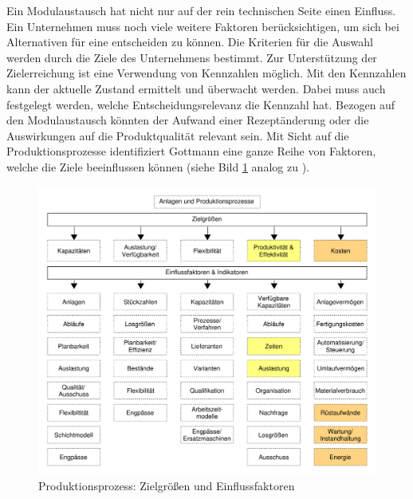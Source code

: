 Ein Modulaustausch hat nicht nur auf der rein technischen Seite einen Einfluss. Ein Unternehmen muss noch viele weitere Faktoren berücksichtigen, um sich bei Alternativen für eine entscheiden zu können. Die Kriterien für die Auswahl werden durch die Ziele des Unternehmens bestimmt. Zur Unterstützung der Zielerreichung ist eine Verwendung von Kennzahlen möglich. Mit den Kennzahlen kann der aktuelle Zustand ermittelt und überwacht werden. Dabei muss auch festgelegt werden, welche Entscheidungsrelevanz die Kennzahl hat.  Bezogen auf den Modulaustausch könnten der Aufwand einer Rezeptänderung oder die Auswirkungen auf die Produktqualität relevant sein. Mit Sicht auf die Produktionsprozesse identifiziert Gottmann \cite{Gottmann2016} eine ganze Reihe von Faktoren, welche die Ziele beeinflussen können (siehe Bild \ref{pic:Produktionsprozesse-Zielgroessen}  analog zu \citep[50]{Gottmann2016}).
\begin{figure}[htb]
\centering
\includegraphics[scale=0.5]{DA_files/Bilder/Analyse/Produktionsprozesse-Zielgroessen.pdf}
\caption{Produktionsprozess: Zielgrößen und Einflussfaktoren}
\label{pic:Produktionsprozesse-Zielgroessen}
\end{figure}

